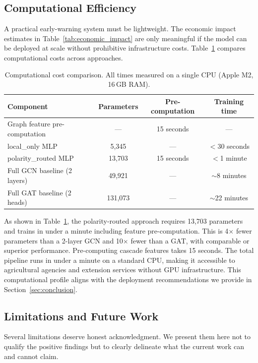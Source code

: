 \documentclass[preprint,12pt,authoryear]{elsarticle}
\begin{document}
\subsection{Computational Efficiency}
\label{sec:computational}

A practical early-warning system must be lightweight. The economic impact estimates in Table~\ref{tab:economic_impact} are only meaningful if the model can be deployed at scale without prohibitive infrastructure costs. Table~\ref{tab:computational} compares computational costs across approaches.

\begin{table}[t]
\centering
\caption{Computational cost comparison. All times measured on a single CPU (Apple M2, 16\,GB RAM).}
\label{tab:computational}
\begin{tabular}{@{}lccc@{}}
\toprule
\textbf{Component} & \textbf{Parameters} & \textbf{Pre-computation} & \textbf{Training time} \\
\midrule
Graph feature pre-computation & --- & 15 seconds & --- \\
local\_only MLP & 5,345 & --- & $<$30 seconds \\
polarity\_routed MLP & 13,703 & 15 seconds & $<$1 minute \\
Full GCN baseline (2 layers) & 49,921 & --- & $\sim$8 minutes \\
Full GAT baseline (2 heads) & 131,073 & --- & $\sim$22 minutes \\
\bottomrule
\end{tabular}
\end{table}

As shown in Table~\ref{tab:computational}, the polarity-routed approach requires 13,703 parameters and trains in under a minute including feature pre-computation. This is 4$\times$ fewer parameters than a 2-layer GCN and 10$\times$ fewer than a GAT, with comparable or superior performance. Pre-computing cascade features takes 15 seconds. The total pipeline runs in under a minute on a standard CPU, making it accessible to agricultural agencies and extension services without GPU infrastructure. This computational profile aligns with the deployment recommendations we provide in Section~\ref{sec:conclusion}.

\subsection{Limitations and Future Work}

Several limitations deserve honest acknowledgment. We present them here not to qualify the positive findings but to clearly delineate what the current work can and cannot claim.
\end{document}
